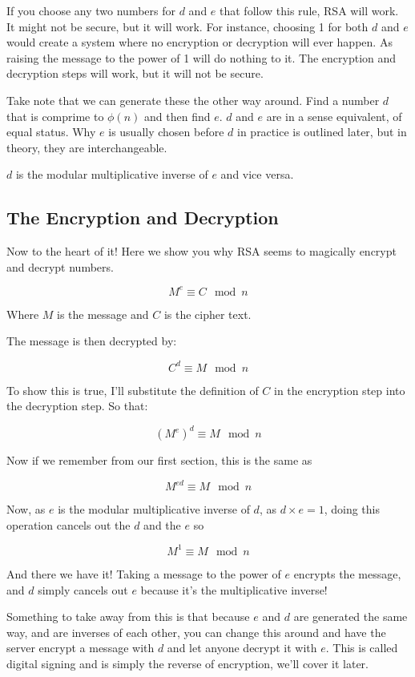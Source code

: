 \documentclass{article}
\begin{document}
  If you choose any two numbers for $d$ and $e$ that follow this rule, RSA will
  work. It might not be secure, but it will work. For instance, choosing 1 for
  both $d$ and $e$ would create a system where no encryption or decryption will
  ever happen. As raising the message to the power of 1 will do nothing to it.
  The encryption and decryption steps will work, but it will not be secure.

  Take note that we can generate these the other way around. Find a number $d$
  that is comprime to $\phi(n)$ and then find $e$. $d$ and $e$ are in a sense
  equivalent, of equal status. Why $e$ is usually chosen before $d$ in practice
  is outlined later, but in theory, they are interchangeable.

  $d$ is the modular multiplicative inverse of $e$ and vice versa.

  \subsection*{The Encryption and Decryption}

  Now to the heart of it! Here we show you why RSA seems to magically encrypt
  and decrypt numbers.

  \[ M^e \equiv C \mod n \]

  Where $M$ is the message and $C$ is the cipher text.

  The message is then decrypted by:

  \[ C^d \equiv M \mod n \]
  
  To show this is true, I'll substitute the definition of $C$ in the encryption
  step into the decryption step. So that:

  \[ (M^e)^d \equiv M \mod n \]

  Now if we remember from our first section, this is the same as

  \[ M^{ed} \equiv M \mod n \]

  Now, as $e$ is the modular multiplicative inverse of $d$, as $d \times e = 1$,
  doing this operation cancels out the $d$ and the $e$ so

  \[ M^{1} \equiv M \mod n \]

  And there we have it! Taking a message to the power of $e$ encrypts the message,
  and $d$ simply cancels out $e$ because it's the multiplicative inverse!

  Something to take away from this is that because $e$ and $d$ are generated 
  the same way, and are inverses of each other, you can change this around and
  have the server encrypt a message with $d$ and let anyone decrypt it with $e$.
  This is called digital signing and is simply the reverse of encryption, we'll
  cover it later.
\end{document}
